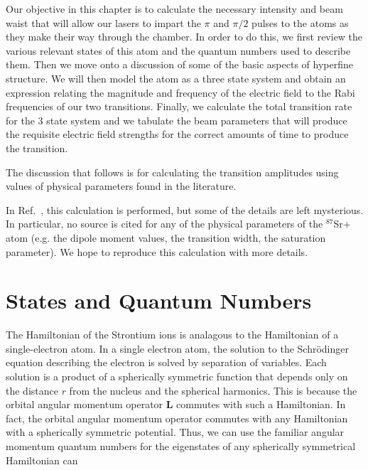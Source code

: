 Our objective in this chapter is to calculate the necessary intensity and beam waist that will allow our lasers to impart the $\pi$ and $\pi/2$ pulses to the atoms as they make their way through the chamber. In order to do this, we first review the various relevant states of this atom and the quantum numbers used to describe them. Then we move onto a discussion of some of the basic aspects of hyperfine structure. We will then model the atom as a three state system and obtain an expression relating the magnitude and frequency of the electric field to the Rabi frequencies of our two transitions. Finally, we calculate the total transition rate for the 3 state system and we tabulate the beam parameters that will produce the requisite electric field strengths for the correct amounts of time to produce the transition.

The discussion that follows is for calculating the transition amplitudes using values of physical parameters found in the literature. 

In Ref.\ \cite{cjeDiss}, this calculation is performed, but some of the details are left mysterious. In particular, no source is cited for any of the physical parameters of the $^{87}$Sr+ atom (e.g. the dipole moment values, the transition width, the saturation parameter). We hope to reproduce this calculation with more details.  

%

\section{States and Quantum Numbers}

The Hamiltonian of the Strontium ions is analagous to the Hamiltonian of a single-electron atom. 
In a single electron atom, the solution to the Schr\"odinger equation describing the electron is solved by separation of variables.
 Each solution is a product of a spherically symmetric function that depends only on the distance $r$ from the nucleus and the spherical harmonics.
This is because the orbital angular momentum operator $\mathbf{L}$ commutes with such a Hamiltonian. In fact, the orbital angular momentum operator commutes with any Hamiltonian with a spherically symmetric potential.
Thus, we can use the familiar angular momentum quantum numbers for the eigenstates of any spherically symmetrical Hamiltonian can 


